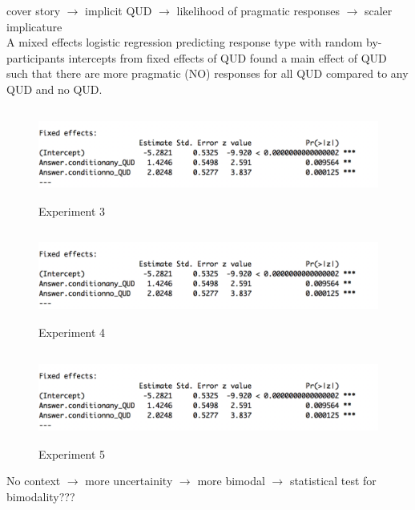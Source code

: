 \documentclass[12pt]{article}
\begin{document}
\noindent cover story $\rightarrow$ implicit QUD $\rightarrow$ likelihood of pragmatic responses $\rightarrow$ scaler implicature\\

\noindent A mixed effects logistic regression predicting response type with random by-participants intercepts from fixed effects of QUD found a main effect of QUD such that there are more pragmatic (NO) responses for all QUD compared to any QUD and no QUD. 

\begin{figure}[!ht]
    \caption*{Experiment 3}
    \includegraphics[height=3cm]{models/exp4_model1_1}
\end{figure}
\begin{figure}[!ht] 
    \caption*{Experiment 4}
    \includegraphics[height=3cm]{models/exp4_model1_1}
\end{figure}
\begin{figure}[!ht]
    \caption*{Experiment 5}
    \includegraphics[height=3cm]{models/exp4_model1_1}
\end{figure} 

\pagebreak

\noindent No context $\rightarrow$ more uncertainity $\rightarrow$ more bimodal $\rightarrow$ statistical test for bimodality???
\end{document}
